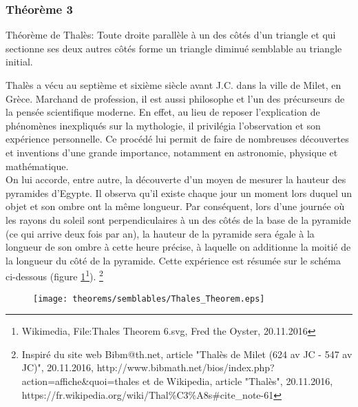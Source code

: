 \documentclass[a4paper,12pt]{article}
\begin{document}
\pagebreak
\subsubsection{Théorème 3}
\begin{theorem}
Théorème de Thalès: Toute droite parallèle à un des côtés d'un triangle et qui sectionne ses deux autres côtés forme un triangle diminué semblable au triangle initial.
\end{theorem}
\begin{remark}
Thalès a vécu au septième et sixième siècle avant J.C. dans la ville de Milet, en Grèce. Marchand de profession, il est aussi philosophe et l'un des précurseurs de la pensée scientifique moderne. En effet, au lieu de reposer l'explication de phénomènes inexpliqués sur la mythologie, il privilégia l'observation et son expérience personnelle. Ce procédé lui permit de faire de nombreuses découvertes et inventions d'une grande importance, notamment en astronomie, physique et mathématique.\\

On lui accorde, entre autre, la découverte d'un moyen de mesurer la hauteur des pyramides d'Egypte. Il observa qu'il existe chaque jour un moment lors duquel un objet et son ombre ont la même longueur. Par conséquent, lors d'une journée où les rayons du soleil sont perpendiculaires à un des côtés de la base de la pyramide (ce qui arrive deux fois par an), la hauteur de la pyramide sera égale à la longueur de son ombre à cette heure précise, à laquelle on additionne la moitié de la longueur du côté de la pyramide. Cette expérience est résumée sur le schéma ci-dessous (figure \ref{fig:thales}\footnote{Wikimedia, File:Thales Theorem 6.svg, Fred the Oyster, 20.11.2016}).
\footnote{Inspiré du site web Bibm@th.net, article "Thalès de Milet (624 av JC - 547 av JC)", 20.11.2016, http://www.bibmath.net/bios/index.php?action=affiche\&quoi=thales et de Wikipedia, article "Thalès", 20.11.2016, https://fr.wikipedia.org/wiki/Thal\%C3\%A8s\#cite\_note-61}


\begin{figure}[H]
    \centering
    \texttt{[image: theorems/semblables/Thales\_Theorem.eps]}
    
    \caption{}
    \label{fig:thales}
\end{figure}
\end{remark}
\end{document}
